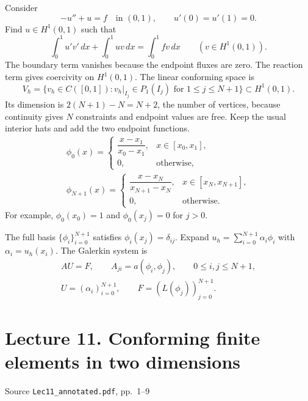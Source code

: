 \documentclass[11pt,a4paper]{article}
\newcommand{\lecturesource}[1]{%
  \par{\small\sffamily\color{Muted}#1}\par\vspace{0.15em}}
\begin{document}
Consider
\[
 -u''+u=f\quad\text{in }(0,1),\qquad u'(0)=u'(1)=0.
\]
Find \(u\in H^1(0,1)\) such that
\[
 \int_0^1u'v'\,dx+\int_0^1uv\,dx=\int_0^1fv\,dx
 \qquad(v\in H^1(0,1)).
\]
The boundary term vanishes because the endpoint fluxes are zero.
The reaction term gives coercivity on \(H^1(0,1)\). The linear
conforming space is
\[
 V_h=\bigl\{v_h\in C([0,1]):v_h|_{I_j}\in P_1(I_j)
       \text{ for }1\le j\le N+1\bigr\}\subset H^1(0,1).
\]
Its dimension is \(2(N+1)-N=N+2\), the number of vertices, because
continuity gives \(N\) constraints and endpoint values are free.
Keep the usual interior hats and add the two endpoint functions.
\[
 \begin{aligned}
 \phi_0(x)=
 \begin{cases}
 \dfrac{x-x_1}{x_0-x_1},&x\in[x_0,x_1],\\[4pt]
 0,&\text{otherwise},
 \end{cases}\\[4pt]
 \phi_{N+1}(x)=
 \begin{cases}
 \dfrac{x-x_N}{x_{N+1}-x_N},&x\in[x_N,x_{N+1}],\\[4pt]
 0,&\text{otherwise}.
 \end{cases}
 \end{aligned}
\]
For example, \(\phi_0(x_0)=1\) and \(\phi_0(x_j)=0\) for \(j>0\).

\begin{center}
\end{center}

The full basis \(\{\phi_i\}_{i=0}^{N+1}\) satisfies
\(\phi_i(x_j)=\delta_{ij}\). Expand
\(u_h=\sum_{i=0}^{N+1}\alpha_i\phi_i\) with \(\alpha_i=u_h(x_i)\).
The Galerkin system is
\[
 \begin{gathered}
 AU=F,\qquad A_{ji}=a(\phi_i,\phi_j),\qquad 0\le i,j\le N+1,\\
 U=(\alpha_i)_{i=0}^{N+1},\qquad F=(L(\phi_j))_{j=0}^{N+1}.
 \end{gathered}
\]

\clearpage
\section{Lecture 11. Conforming finite elements in two dimensions}
\lecturesource{Source \enspace\texttt{Lec11\_annotated.pdf}, pp.~1--9}
\end{document}
